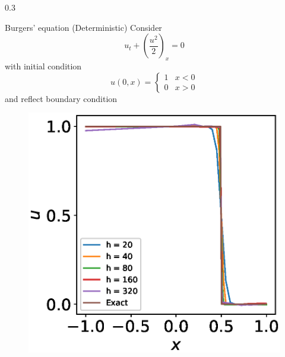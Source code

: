 \documentclass{msuposter}
\newcommand{\colwidth}{0.3\linewidth}
\begin{document}
\begin{frame}{}
\begin{columns}[t]
\begin{column}{\colwidth}
\begin{exampleblock}{Burgers' equation (Deterministic)}
\large
Consider 
 \begin{equation}\label{eqn:bur}
 	u_t + (\frac{u^2}{2})_x = 0
 \end{equation} 
 with initial condition 
 \begin{equation}\label{eqn:bur ic}
 	u(0,x) = \left\{
 	\begin{matrix}
 		1 & x<0\\
 		 0 & x>0
 	\end{matrix}
 	\right.
 \end{equation}
 and reflect boundary condition
\begin{figure}
\includegraphics[width = 0.7\linewidth]{Burgus_equation_numerical_100.eps}
\end{figure}
\end{exampleblock}


\end{column}
\end{columns}
\end{frame}
\end{document}

